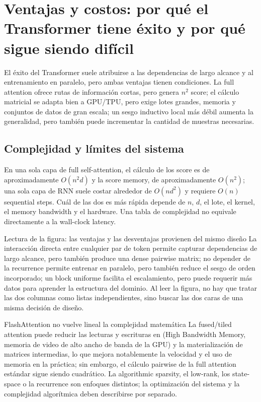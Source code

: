 \section{Ventajas y costos: por qué el Transformer tiene éxito y por qué sigue siendo difícil}

El éxito del Transformer suele atribuirse a las dependencias de largo alcance y al entrenamiento en paralelo, pero ambas ventajas tienen condiciones. La full attention ofrece rutas de información cortas, pero genera $n^2$ score; el cálculo matricial se adapta bien a GPU/TPU, pero exige lotes grandes, memoria y conjuntos de datos de gran escala; un sesgo inductivo local más débil aumenta la generalidad, pero también puede incrementar la cantidad de muestras necesarias.

\subsection{Complejidad y límites del sistema}

En una sola capa de full self-attention, el cálculo de los score es de aproximadamente $O(n^2d)$ y la score memory, de aproximadamente $O(n^2)$; una sola capa de RNN suele costar alrededor de $O(nd^2)$ y requiere $O(n)$ sequential steps. Cuál de las dos es más rápida depende de $n$, $d$, el lote, el kernel, el memory bandwidth y el hardware. Una tabla de complejidad no equivale directamente a la wall-clock latency.


\begin{knowledgebox}{Lectura de la figura: las ventajas y las desventajas provienen del mismo diseño}
La interacción directa entre cualquier par de token permite capturar dependencias de largo alcance, pero también produce una dense pairwise matrix; no depender de la recurrence permite entrenar en paralelo, pero también reduce el sesgo de orden incorporado; un block uniforme facilita el escalamiento, pero puede requerir más datos para aprender la estructura del dominio. Al leer la figura, no hay que tratar las dos columnas como listas independientes, sino buscar las dos caras de una misma decisión de diseño.
\end{knowledgebox}

\begin{warningbox}{FlashAttention no vuelve lineal la complejidad matemática}
La fused/tiled attention puede reducir las lecturas y escrituras en  (High Bandwidth Memory, memoria de video de alto ancho de banda de la GPU) y la materialización de matrices intermedias, lo que mejora notablemente la velocidad y el uso de memoria en la práctica; sin embargo, el cálculo pairwise de la full attention estándar sigue siendo cuadrático. La algorithmic sparsity, el low-rank, los state-space o la recurrence son enfoques distintos; la optimización del sistema y la complejidad algorítmica deben describirse por separado.
\end{warningbox}

